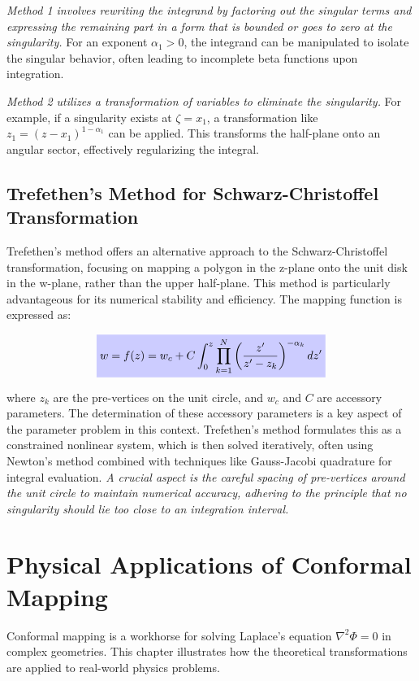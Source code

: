 \documentclass[12pt, a4paper]{report}
\newcommand{\highlight}[2]{\colorbox{#1!20}{$\displaystyle #2$}}
\newcommand{\impformula}[1]{\highlight{blue}{#1}}
\newcommand{\imppoint}[1]{\colorbox{green!10}{\textit{#1}}}
\begin{document}
\imppoint{Method 1 involves rewriting the integrand by factoring out the singular terms and expressing the remaining part in a form that is bounded or goes to zero at the singularity.} For an exponent $\alpha_1 > 0$, the integrand can be manipulated to isolate the singular behavior, often leading to incomplete beta functions upon integration.

\imppoint{Method 2 utilizes a transformation of variables to eliminate the singularity.} For example, if a singularity exists at $\zeta = x_1$, a transformation like $z_1 = (z - x_1)^{1-\alpha_1}$ can be applied. This transforms the half-plane onto an angular sector, effectively regularizing the integral.

\section{Trefethen's Method for Schwarz-Christoffel Transformation}

Trefethen's method offers an alternative approach to the Schwarz-Christoffel transformation, focusing on mapping a polygon in the z-plane onto the unit disk in the w-plane, rather than the upper half-plane. This method is particularly advantageous for its numerical stability and efficiency. The mapping function is expressed as:

\begin{equation}
    \impformula{w = f(z) = w_c + C \int_0^z \prod_{k=1}^N \left(\frac{z'}{z' - z_k}\right)^{-\alpha_k} dz'} \label{eq:Trefethen_formula}
\end{equation}

where $z_k$ are the pre-vertices on the unit circle, and $w_c$ and $C$ are accessory parameters. The determination of these accessory parameters is a key aspect of the parameter problem in this context. Trefethen's method formulates this as a constrained nonlinear system, which is then solved iteratively, often using Newton's method combined with techniques like Gauss-Jacobi quadrature for integral evaluation. \imppoint{A crucial aspect is the careful spacing of pre-vertices around the unit circle to maintain numerical accuracy, adhering to the principle that no singularity should lie too close to an integration interval.}

\chapter{Physical Applications of Conformal Mapping}

Conformal mapping is a workhorse for solving Laplace's equation $\nabla^2 \Phi = 0$ in complex geometries. This chapter illustrates how the theoretical transformations are applied to real-world physics problems.
\end{document}
